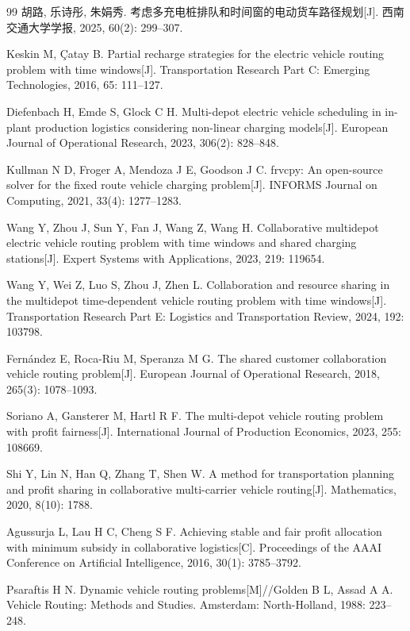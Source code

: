\documentclass{setp-new}
\begin{document}
\begin{thebibliography}{99}
 胡路, 乐诗彤, 朱娟秀. 考虑多充电桩排队和时间窗的电动货车路径规划[J]. 西南交通大学学报, 2025, 60(2): 299--307.

 Keskin M, \c{C}atay B. Partial recharge strategies for the electric vehicle routing problem with time windows[J]. Transportation Research Part C: Emerging Technologies, 2016, 65: 111--127.

 Diefenbach H, Emde S, Glock C H. Multi-depot electric vehicle scheduling in in-plant production logistics considering non-linear charging models[J]. European Journal of Operational Research, 2023, 306(2): 828--848.

 Kullman N D, Froger A, Mendoza J E, Goodson J C. frvcpy: An open-source solver for the fixed route vehicle charging problem[J]. INFORMS Journal on Computing, 2021, 33(4): 1277--1283.

 Wang Y, Zhou J, Sun Y, Fan J, Wang Z, Wang H. Collaborative multidepot electric vehicle routing problem with time windows and shared charging stations[J]. Expert Systems with Applications, 2023, 219: 119654.

 Wang Y, Wei Z, Luo S, Zhou J, Zhen L. Collaboration and resource sharing in the multidepot time-dependent vehicle routing problem with time windows[J]. Transportation Research Part E: Logistics and Transportation Review, 2024, 192: 103798.

 Fern\'{a}ndez E, Roca-Riu M, Speranza M G. The shared customer collaboration vehicle routing problem[J]. European Journal of Operational Research, 2018, 265(3): 1078--1093.

 Soriano A, Gansterer M, Hartl R F. The multi-depot vehicle routing problem with profit fairness[J]. International Journal of Production Economics, 2023, 255: 108669.

 Shi Y, Lin N, Han Q, Zhang T, Shen W. A method for transportation planning and profit sharing in collaborative multi-carrier vehicle routing[J]. Mathematics, 2020, 8(10): 1788.

 Agussurja L, Lau H C, Cheng S F. Achieving stable and fair profit allocation with minimum subsidy in collaborative logistics[C]. Proceedings of the AAAI Conference on Artificial Intelligence, 2016, 30(1): 3785--3792.

 Psaraftis H N. Dynamic vehicle routing problems[M]//Golden B L, Assad A A. Vehicle Routing: Methods and Studies. Amsterdam: North-Holland, 1988: 223--248.


\end{thebibliography}
\end{document}
